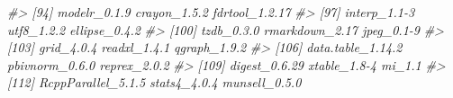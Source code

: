 \documentclass[
]{book}
\newenvironment{Shaded}{\begin{snugshade}}{\end{snugshade}}
\newcommand{\CommentTok}[1]{\textcolor[rgb]{0.56,0.35,0.01}{\textit{#1}}}
\begin{document}
\begin{Shaded}
\begin{Highlighting}[]
\CommentTok{\#\textgreater{}  [94] modelr\_0.1.9        crayon\_1.5.2        fdrtool\_1.2.17     }
\CommentTok{\#\textgreater{}  [97] interp\_1.1{-}3        utf8\_1.2.2          ellipse\_0.4.2      }
\CommentTok{\#\textgreater{} [100] tzdb\_0.3.0          rmarkdown\_2.17      jpeg\_0.1{-}9         }
\CommentTok{\#\textgreater{} [103] grid\_4.0.4          readxl\_1.4.1        qgraph\_1.9.2       }
\CommentTok{\#\textgreater{} [106] data.table\_1.14.2   pbivnorm\_0.6.0      reprex\_2.0.2       }
\CommentTok{\#\textgreater{} [109] digest\_0.6.29       xtable\_1.8{-}4        mi\_1.1             }
\CommentTok{\#\textgreater{} [112] RcppParallel\_5.1.5  stats4\_4.0.4        munsell\_0.5.0}
\end{Highlighting}
\end{Shaded}


  
\end{document}
